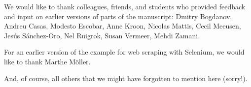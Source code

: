 We would like to thank colleagues, friends, and students who provided feedback and input on earlier versions of parts of the manuscript: 
Dmitry Bogdanov,
Andreu Casas,
Modesto Escobar,
Anne Kroon,
Nicolas Mattis,
Cecil Meeusen,
Jesús Sánchez-Oro,
Nel Ruigrok,
Susan Vermeer,
Mehdi Zamani.

For an earlier version of the example for web scraping with Selenium, we would like to thank Marthe Möller.

And, of course, all others that we might have forgotten to mention here (sorry!).
